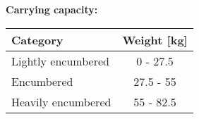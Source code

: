 \documentclass[11pt]{article}
\begin{document}
\vspace{10mm}

\textbf{Carrying capacity:} \\

	\begin{tabular}{l|c}
Category & Weight [kg] \\
\hline
Lightly encumbered 	& 0 - 27.5 	\\
Encumbered 			& 27.5 - 55 \\
Heavily encumbered	& 55 - 82.5
	\end{tabular}
\end{document}
